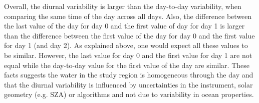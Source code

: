 \documentclass[onecolumn,3p,letterpaper,11pt]{elsarticle}
\begin{document}
Overall, the diurnal variability is larger than the day-to-day variability, when comparing the same time of the day across all days. Also, the difference between the last value of the day for day 0 and the first value of day for day 1 is larger than the difference between the first value of the day for day 0 and the first value for day 1 (and day 2). As explained above, one would expect all these values to be similar. However, the last value for day 0 and the first value for day 1 are not equal while the day-to-day value for the first value of the day are similar. These facts suggests the water in the study region is homogeneous through the day and that the diurnal variability is influenced by uncertainties in the instrument, solar geometry (e.g. SZA) or algorithms and not due to variability in ocean properties.
\end{document}
